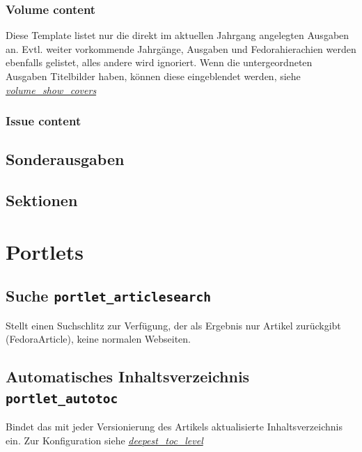 \documentclass[a4paper,10pt,ngerman]{sphinxmanual}
\begin{document}
\subsection{Volume content}
\label{ausgaben:volume-content}
Diese Template listet nur die direkt im aktuellen Jahrgang angelegten Ausgaben
an. Evtl. weiter vorkommende Jahrgänge, Ausgaben und Fedorahierachien werden
ebenfalls gelistet, alles andere wird ignoriert. Wenn die untergeordneten
Ausgaben Titelbilder haben, können diese eingeblendet werden, siehe
{\hyperref[dipp_properties:prop-volume-show-covers]{\emph{volume\_show\_covers}}}


\subsection{Issue content}
\label{ausgaben:issue-content}

\section{Sonderausgaben}
\label{ausgaben:id1}\label{ausgaben:sonderausgaben}

\section{Sektionen}
\label{ausgaben:sektionen}\label{ausgaben:id2}

\chapter{Portlets}
\label{portlets::doc}\label{portlets:portlets}

\section{Suche \texttt{portlet\_articlesearch}}
\label{portlets:portlet-articlesearch}\label{portlets:suche-portlet-articlesearch}
Stellt einen Suchschlitz zur Verfügung, der als Ergebnis nur Artikel zurückgibt (FedoraArticle),
keine normalen Webseiten.


\section{Automatisches Inhaltsverzeichnis \texttt{portlet\_autotoc}}
\label{portlets:automatisches-inhaltsverzeichnis-portlet-autotoc}\label{portlets:portlet-autotoc}
Bindet das mit jeder Versionierung des Artikels aktualisierte Inhaltsverzeichnis
ein. Zur Konfiguration siehe {\hyperref[dipp_properties:prop-deepest-toc-level]{\emph{deepest\_toc\_level}}}
\end{document}
